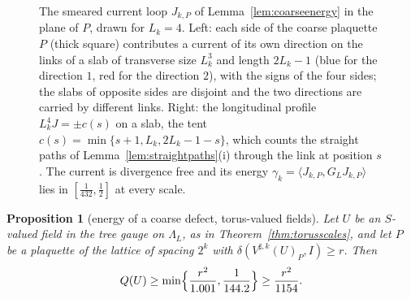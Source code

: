 \documentclass[11pt]{amsart}
\newtheorem{proposition}[theorem]{Proposition}
\theoremstyle{definition}
\theoremstyle{remark}
\numberwithin{equation}{section}
\newcommand{\ip}[2]{\langle #1,#2\rangle}
\begin{document}
\begin{figure}[t]
\centering
{}
\hspace{1em}
\caption{The smeared current loop $J_{k,P}$ of Lemma~\ref{lem:coarseenergy}
in the plane of $P$, drawn for $L_k=4$. Left: each side of the coarse
plaquette $P$ (thick square) contributes a current of its own direction on
the links of a slab of transverse size $L_k^3$ and length $2L_k-1$ (blue for
the direction $1$, red for the direction $2$), with the signs of the four
sides; the slabs of opposite sides are disjoint and the two directions are
carried by different links. Right: the longitudinal profile $L_k^4J=\pm c(s)$
on a slab, the tent $c(s)=\min\{s+1,L_k,2L_k-1-s\}$, which counts the
straight paths of Lemma~\ref{lem:straightpaths}(i) through the link at
position $s$. The current is divergence free and its energy
$\gamma_k=\ip{J_{k,P}}{G_LJ_{k,P}}$ lies in $[\frac1{432},\frac12]$ at every
scale.}
\label{fig:smearedloop}
\end{figure}

\begin{proposition}[energy of a coarse defect, torus-valued fields]
\label{prop:torusenergy}
Let $U$ be an $S$-valued field in the tree gauge on $\Lambda_L$, as in
Theorem~\ref{thm:torusscales}, and let $P$ be a plaquette of the lattice
of spacing $2^k$ with $\delta(V^{\sharp,k}(U)_P,I)\ge r$. Then
\[
Q(U)\ge\min\Bigl\{\frac{r^2}{1.001},\frac1{144.2}\Bigr\}\ge\frac{r^2}
{1154}.
\]
\end{proposition}
\end{document}
